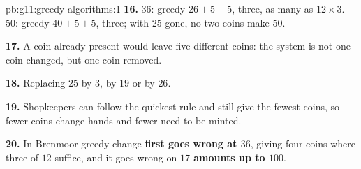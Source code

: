 \begin{solution}{pb:g11:greedy-algorithms:1}
\textbf{16.} $36$: greedy $26 + 5 + 5$, three, as many as $12 \times 3$. $50$: greedy $40 + 5 + 5$, three; with $25$
gone, no two coins make $50$.

\textbf{17.} A coin already present would leave five different coins: the system is not one coin changed, but one coin
removed.

\textbf{18.} Replacing $25$ by $3$, by $19$ or by $26$.

\textbf{19.} Shopkeepers can follow the quickest rule and still give the fewest coins, so fewer coins change hands and
fewer need to be minted.

\textbf{20.} In Brenmoor greedy change \textbf{first goes wrong at $36$}, giving four coins where three of $12$ suffice,
and it goes wrong on \textbf{$17$ amounts up to $100$}.
\end{solution}
